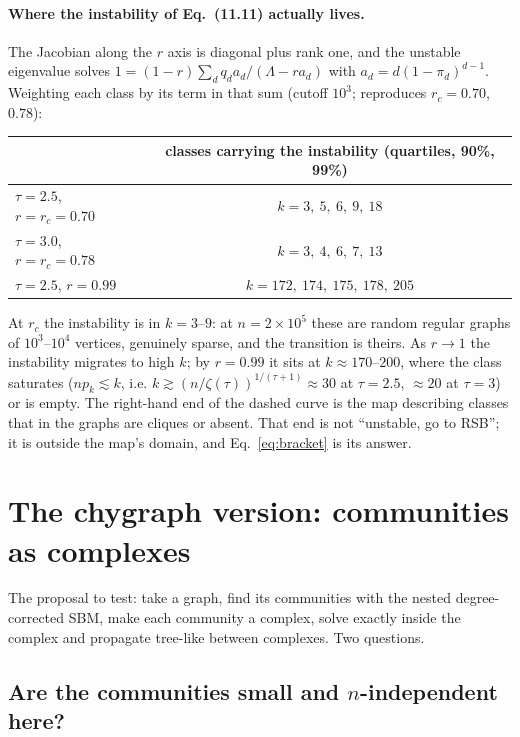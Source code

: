\documentclass[11pt]{article}
\begin{document}
\paragraph{Where the instability of Eq.~(11.11) actually lives.} The Jacobian
along the $r$ axis is diagonal plus rank one, and the unstable eigenvalue
solves $1=(1-r)\sum_d q_d a_d/(\Lambda-r a_d)$ with
$a_d=d(1-\pi_d)^{d-1}$. Weighting each class by its term in that sum (cutoff
$10^3$; reproduces $r_c=0.70$, $0.78$):
\begin{center}
\begin{tabular}{lc}
\toprule
 & classes carrying the instability (quartiles, 90\%, 99\%)\\
\midrule
$\tau=2.5$, $r=r_c=0.70$ & $k=3,\ 5,\ 6,\ 9,\ 18$\\
$\tau=3.0$, $r=r_c=0.78$ & $k=3,\ 4,\ 6,\ 7,\ 13$\\
$\tau=2.5$, $r=0.99$ & $k=172,\ 174,\ 175,\ 178,\ 205$\\
\bottomrule
\end{tabular}
\end{center}
At $r_c$ the instability is in $k=3$--$9$: at $n=2\times10^5$ these are
random regular graphs of $10^3$--$10^4$ vertices, genuinely sparse, and the
transition is theirs. As $r\to1$ the instability migrates to high $k$; by
$r=0.99$ it sits at $k\approx170$--$200$, where the class saturates
($np_k\lesssim k$, i.e. $k\gtrsim(n/\zeta(\tau))^{1/(\tau+1)}\approx30$ at
$\tau=2.5$, $\approx20$ at $\tau=3$) or is empty. The right-hand end of the
dashed curve is the map describing classes that in the graphs are cliques or
absent. That end is not ``unstable, go to RSB''; it is outside the map's
domain, and Eq.~\eqref{eq:bracket} is its answer.

\section{The chygraph version: communities as complexes}

The proposal to test: take a graph, find its communities with the nested
degree-corrected SBM, make each community a complex, solve exactly inside the
complex and propagate tree-like between complexes. Two questions.

\subsection{Are the communities small and $n$-independent here?}
\end{document}
